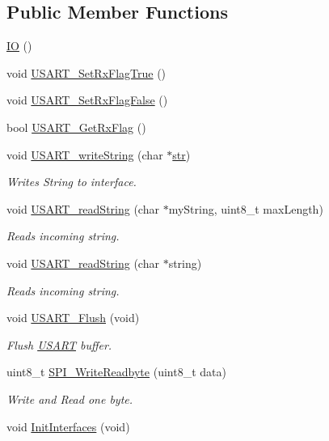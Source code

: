 \subsection*{Public Member Functions}
\begin{DoxyCompactItemize}
\item 
\hyperlink{classIO_a49b27a2ee79bce0de4e3ef163cbebd30}{IO} ()
\item 
void \hyperlink{classIO_ad7933ecdc01630b62be377ab873fea21}{U\+S\+A\+R\+T\+\_\+\+Set\+Rx\+Flag\+True} ()
\item 
void \hyperlink{classIO_a69cddfa296c916c81cf7480c6c7f9139}{U\+S\+A\+R\+T\+\_\+\+Set\+Rx\+Flag\+False} ()
\item 
bool \hyperlink{classIO_af8171de8979d317fec0a187ba087a626}{U\+S\+A\+R\+T\+\_\+\+Get\+Rx\+Flag} ()
\item 
void \hyperlink{classIO_a240a25927946ea2994e271eb56948362}{U\+S\+A\+R\+T\+\_\+write\+String} (char $\ast$\hyperlink{main_8cpp_ac19b967928c4ef5b461808cbac40840c}{str})
\begin{DoxyCompactList}\small\item\em Writes String to interface. \end{DoxyCompactList}\item 
void \hyperlink{classIO_a1febbd3f3b0a0a482226ee1659f2f7d1}{U\+S\+A\+R\+T\+\_\+read\+String} (char $\ast$my\+String, uint8\+\_\+t max\+Length)
\begin{DoxyCompactList}\small\item\em Reads incoming string. \end{DoxyCompactList}\item 
void \hyperlink{classIO_a00d8980cbb7e31f0583a65305dacff9e}{U\+S\+A\+R\+T\+\_\+read\+String} (char $\ast$string)
\begin{DoxyCompactList}\small\item\em Reads incoming string. \end{DoxyCompactList}\item 
void \hyperlink{classIO_a04360979dfc7e8960abb4b7659257b68}{U\+S\+A\+R\+T\+\_\+\+Flush} (void)
\begin{DoxyCompactList}\small\item\em Flush \hyperlink{classUSART}{U\+S\+A\+RT} buffer. \end{DoxyCompactList}\item 
uint8\+\_\+t \hyperlink{classIO_acf88aa0feccc7ba9526c232d36e368b2}{S\+P\+I\+\_\+\+Write\+Readbyte} (uint8\+\_\+t data)
\begin{DoxyCompactList}\small\item\em Write and Read one byte. \end{DoxyCompactList}\item 
void \hyperlink{classIO_add6f3bdf0120b0d63d7b48a72e8edc1e}{Init\+Interfaces} (void)
\end{DoxyCompactItemize}
